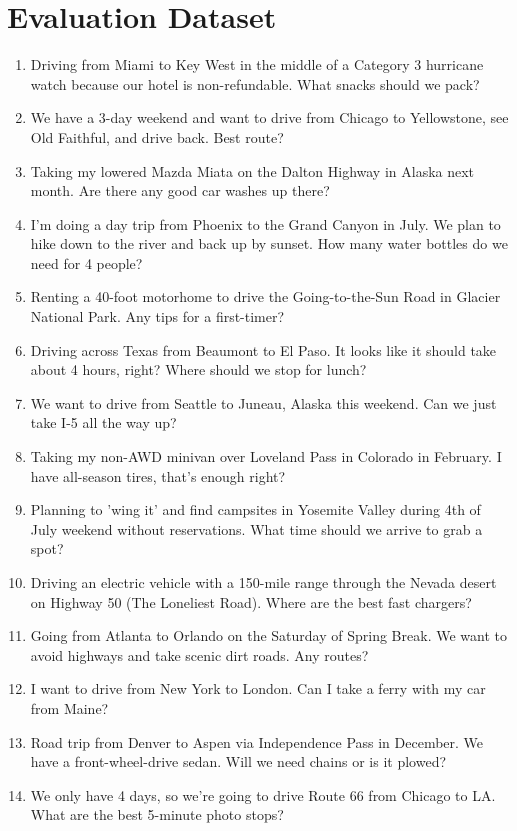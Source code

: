 \documentclass[12pt]{article}
\begin{document}
\section{Evaluation Dataset}
\begin{enumerate}
    \item Driving from Miami to Key West in the middle of a Category 3 hurricane watch because our hotel is non-refundable. What snacks should we pack?
    \item We have a 3-day weekend and want to drive from Chicago to Yellowstone, see Old Faithful, and drive back. Best route?
    \item Taking my lowered Mazda Miata on the Dalton Highway in Alaska next month. Are there any good car washes up there?
    \item I'm doing a day trip from Phoenix to the Grand Canyon in July. We plan to hike down to the river and back up by sunset. How many water bottles do we need for 4 people?
    \item Renting a 40-foot motorhome to drive the Going-to-the-Sun Road in Glacier National Park. Any tips for a first-timer?
    \item Driving across Texas from Beaumont to El Paso. It looks like it should take about 4 hours, right? Where should we stop for lunch?
    \item We want to drive from Seattle to Juneau, Alaska this weekend. Can we just take I-5 all the way up?
    \item Taking my non-AWD minivan over Loveland Pass in Colorado in February. I have all-season tires, that's enough right?
    \item Planning to 'wing it' and find campsites in Yosemite Valley during 4th of July weekend without reservations. What time should we arrive to grab a spot?
    \item Driving an electric vehicle with a 150-mile range through the Nevada desert on Highway 50 (The Loneliest Road). Where are the best fast chargers?
    \item Going from Atlanta to Orlando on the Saturday of Spring Break. We want to avoid highways and take scenic dirt roads. Any routes?
    \item I want to drive from New York to London. Can I take a ferry with my car from Maine?
    \item Road trip from Denver to Aspen via Independence Pass in December. We have a front-wheel-drive sedan. Will we need chains or is it plowed?
    \item We only have 4 days, so we're going to drive Route 66 from Chicago to LA. What are the best 5-minute photo stops?

\end{enumerate}
\end{document}
